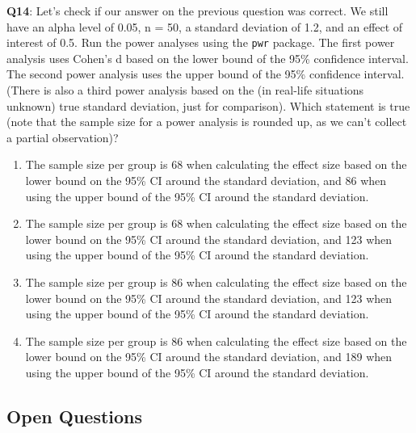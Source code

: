 \documentclass[
  oneside]{krantz}
\providecommand{\tightlist}{%
  \setlength{\itemsep}{0pt}\setlength{\parskip}{0pt}}
\begin{document}
\textbf{Q14}: Let's check if our answer on the previous question was correct. We still have an alpha level of 0.05, n = 50, a standard deviation of 1.2, and an effect of interest of 0.5. Run the power analyses using the \texttt{pwr} package. The first power analysis uses Cohen's d based on the lower bound of the 95\% confidence interval. The second power analysis uses the upper bound of the 95\% confidence interval. (There is also a third power analysis based on the (in real-life situations unknown) true standard deviation, just for comparison). Which statement is true (note that the sample size for a power analysis is rounded up, as we can't collect a partial observation)?

\begin{enumerate}
\def\labelenumi{\Alph{enumi})}
\tightlist
\item
  The sample size per group is 68 when calculating the effect size based on the lower bound on the 95\% CI around the standard deviation, and 86 when using the upper bound of the 95\% CI around the standard deviation.
\item
  The sample size per group is 68 when calculating the effect size based on the lower bound on the 95\% CI around the standard deviation, and 123 when using the upper bound of the 95\% CI around the standard deviation.
\item
  The sample size per group is 86 when calculating the effect size based on the lower bound on the 95\% CI around the standard deviation, and 123 when using the upper bound of the 95\% CI around the standard deviation.
\item
  The sample size per group is 86 when calculating the effect size based on the lower bound on the 95\% CI around the standard deviation, and 189 when using the upper bound of the 95\% CI around the standard deviation.
\end{enumerate}

\hypertarget{open-questions-5}{%
\subsection{Open Questions}\label{open-questions-5}}
\end{document}
